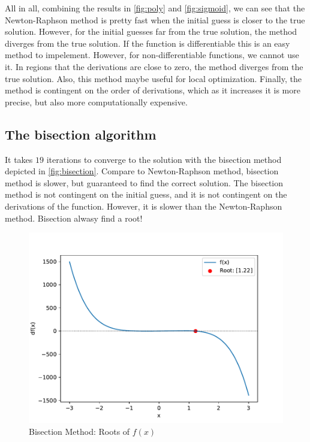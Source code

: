 \documentclass[a4paper,10pt,american]{article}
\begin{document}
All in all, combining the results in \autoref{fig:poly} and \autoref{fig:sigmoid}, we can see that the Newton-Raphson method is pretty fast when the initial guess is closer to the true solution. However, for the initial guesses far from the true solution, the method diverges from the true solution. If the function is differentiable this is an easy method to impelement. However, for non-differentiable functions, we cannot use it. In regions that the derivations are close to zero, the method diverges from the true solution. Also, this method maybe useful for local optimization. Finally, the method is contingent on the order of derivations, which as it increases it is more precise, but also more computationally expensive.

\subsection{The bisection algorithm}

It takes $19$ iterations to converge to the solution with the bisection method depicted in \autoref{fig:bisection}. Compare to Newton-Raphson method, bisection method is slower, but guaranteed to find the correct solution. The bisection method is not contingent on the initial guess, and it is not contingent on the derivations of the function. However, it is slower than the Newton-Raphson method. Bisection alwasy find a root!

\begin{figure}[H]
\centering
\includegraphics[width=1\linewidth]{../Plots/Bisection.pdf}
\caption{Bisection Method: Roots of $f(x)$}
\label{fig:bisection}
\end{figure}
\end{document}
